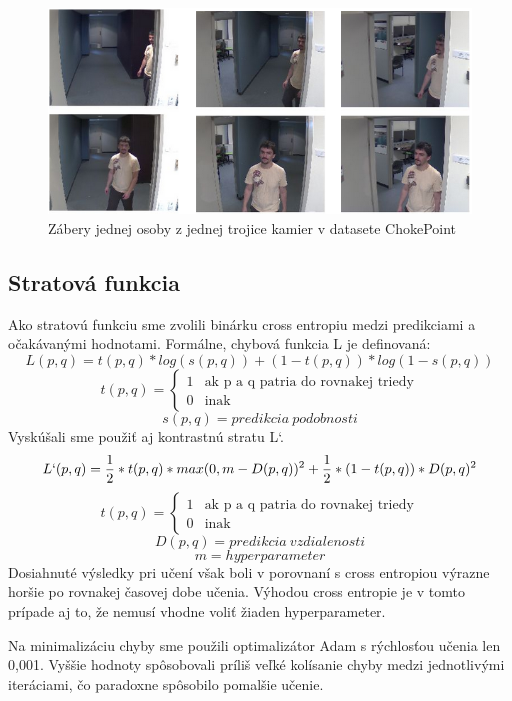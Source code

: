 \begin{figure}[H]
\centerline{\includegraphics[width=1\textwidth]{images/chokepoint_same}}
\caption[Ukážka datasetu]{Zábery jednej osoby z jednej trojice kamier v datasete ChokePoint}
\label{obr:choke_same}
\end{figure}

\subsection{Stratová funkcia}
Ako stratovú funkciu sme zvolili binárku cross entropiu medzi predikciami a očakávanými hodnotami.
Formálne, chybová funkcia L je definovaná:
$$L(p, q) = t(p, q) * log(s(p, q)) + (1 - t(p, q)) * log(1 - s(p, q))$$
\[
  t(p, q) =
  \begin{cases}
    1 & \text{ak p a q patria do rovnakej triedy} \\
    0 & \text{inak}
  \end{cases}
\]
$$s(p, q) = predikcia\ podobnosti$$
Vyskúšali sme použiť aj kontrastnú stratu L`.
$$L`(p, q) = \frac{1}{2} * t(p, q) * max(0, m - D(p, q))^2 + \frac{1}{2}*(1 - t(p, q)) * D(p, q)^2$$
\[
  t(p, q) =
  \begin{cases}
    1 & \text{ak p a q patria do rovnakej triedy} \\
    0 & \text{inak}
  \end{cases}
\]
$$D(p, q) = predikcia\ vzdialenosti$$
$$m = hyperparameter$$
Dosiahnuté výsledky pri učení však boli v porovnaní s cross entropiou výrazne horšie po rovnakej časovej dobe učenia.
Výhodou cross entropie je v tomto prípade aj to, že nemusí vhodne voliť žiaden hyperparameter.

Na minimalizáciu chyby sme použili optimalizátor Adam s rýchlosťou učenia len 0,001.
Vyššie hodnoty spôsobovali príliš veľké kolísanie chyby medzi jednotlivými iteráciami, čo paradoxne spôsobilo pomalšie učenie.

